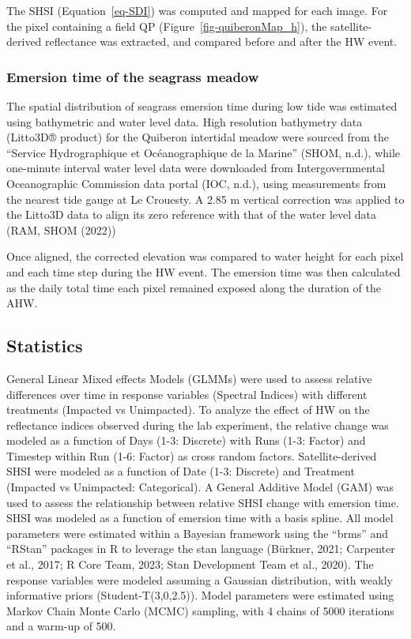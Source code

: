 \documentclass[
  letterpaper,
  11pt,
  english,
  singlespacing,
  headsepline]{MastersDoctoralThesis}
\begin{document}
\begin{spacing}{1.5}
The SHSI (Equation~\ref{eq-SDI}) was computed and mapped for each image.
For the pixel containing a field QP (Figure~\ref{fig-quiberonMap_h}),
the satellite-derived reflectance was extracted, and compared before and
after the HW event.

\subsubsection{Emersion time of the seagrass
meadow}\label{emersion-time-of-the-seagrass-meadow}

The spatial distribution of seagrass emersion time during low tide was
estimated using bathymetric and water level data. High resolution
bathymetry data (Litto3D® product) for the Quiberon intertidal meadow
were sourced from the ``Service Hydrographique et Océanographique de la
Marine'' (SHOM, n.d.), while one-minute interval water level data were
downloaded from Intergovernmental Oceanographic Commission data portal
(IOC, n.d.), using measurements from the nearest tide gauge at Le
Crouesty. A 2.85 m vertical correction was applied to the Litto3D data
to align its zero reference with that of the water level data (RAM, SHOM
(2022))

Once aligned, the corrected elevation was compared to water height for
each pixel and each time step during the HW event. The emersion time was
then calculated as the daily total time each pixel remained exposed
along the duration of the AHW.

\subsection{Statistics}\label{statistics}

General Linear Mixed effects Models (GLMMs) were used to assess relative
differences over time in response variables (Spectral Indices) with
different treatments (Impacted vs Unimpacted). To analyze the effect of
HW on the reflectance indices observed during the lab experiment, the
relative change was modeled as a function of Days (1-3: Discrete) with
Runs (1-3: Factor) and Timestep within Run (1-6: Factor) as cross random
factors. Satellite-derived SHSI were modeled as a function of Date (1-3:
Discrete) and Treatment (Impacted vs Unimpacted: Categorical). A General
Additive Model (GAM) was used to assess the relationship between
relative SHSI change with emersion time. SHSI was modeled as a function
of emersion time with a basis spline. All model parameters were
estimated within a Bayesian framework using the ``brms'' and ``RStan''
packages in R to leverage the stan language (Bürkner, 2021; Carpenter et
al., 2017; R Core Team, 2023; Stan Development Team et al., 2020). The
response variables were modeled assuming a Gaussian distribution, with
weakly informative priors (Student-T(3,0,2.5)). Model parameters were
estimated using Markov Chain Monte Carlo (MCMC) sampling, with 4 chains
of 5000 iterations and a warm-up of 500.


\end{spacing}
\end{document}
